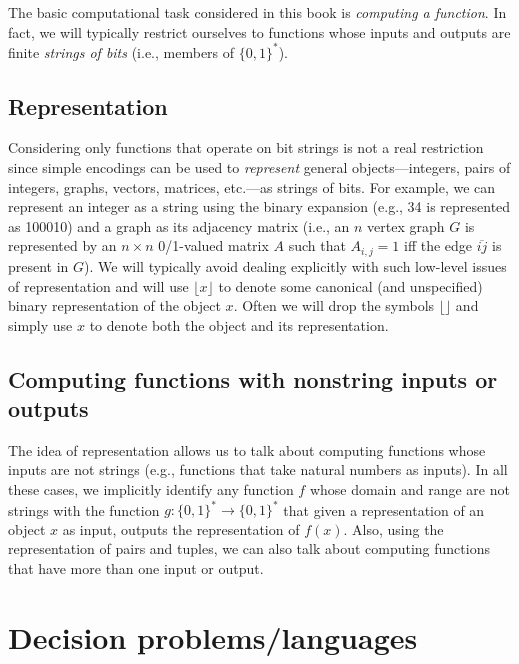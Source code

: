 The basic computational task considered in this book is \emph{computing a function}. In fact, we will typically restrict ourselves to functions whose inputs and outputs are finite \emph{strings of bits} (i.e., members of $\{0,1\}^*$).

\subsection*{Representation}
Considering only functions that operate on bit strings is not a real restriction since simple encodings can be used to \emph{represent} general objects---integers, pairs of integers, graphs, vectors, matrices, etc.---as strings of bits. For example, we can represent an integer as a string using the binary expansion (e.g., 34 is represented as 100010) and a graph as its adjacency matrix (i.e., an $n$ vertex graph $G$ is represented by an $n \times n$ 0/1-valued matrix $A$ such that $A_{i,j} = 1$ iff the edge $\overline{ij}$ is present in $G$). We will typically avoid dealing explicitly with such low-level issues of representation and will use $\lfloor x \rfloor$ to denote some canonical (and unspecified) binary representation of the object $x$. Often we will drop the symbols $\lfloor \rfloor$ and simply use $x$ to denote both the object and its representation.
\subsection*{Computing functions with nonstring inputs or outputs}
The idea of representation allows us to talk about computing functions whose inputs are not strings (e.g., functions that take natural numbers as inputs). In all these cases, we implicitly identify any function $f$ whose domain and range are not strings with the function $g : \{0,1\}^* \rightarrow \{0,1\}^*$ that given a representation of an object $x$ as input, outputs the representation of $f(x)$. Also, using the representation of pairs and tuples, we can also talk about computing functions that have more than one input or output.

\section{Decision problems/languages}

